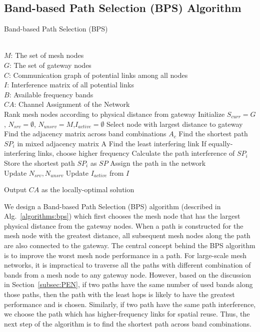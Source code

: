 \subsection{Band-based Path Selection (BPS) Algorithm}
\label{subsec:BPS}

\begin{algorithm}[t]
    \small
\caption{Band-based Path Selection (BPS)}
\label{algorithms:bps}
\begin{algorithmic}[1]
\REQUIRE  ~~\\
	$M$: The set of mesh nodes\\
	$G$: The set of gateway nodes\\
	$C$: Communication graph of potential links among all nodes\\
	$I$: Interference matrix of all potential links \\
	$B$: Available frequency bands
\ENSURE ~~\\    
$CA$: Channel Assignment of the Network\\
\STATE Rank mesh nodes according to physical distance from gateway
\STATE Initialize $S_{curr}=G$, $N_{srv}=\emptyset$, $N_{unsrv}=M$,$I_{active}=\emptyset$
\STATE Select node with largest distance to gateway
\STATE Find the adjacency matrix across band combinations $A_c$
\STATE Find the shortest path $SP_i$ in mixed adjacency matrix A 
\STATE Find the least interfering link
\STATE If equally-interfering links, choose higher frequency
\STATE Calculate the path interference of $SP_i$
\ENDFOR
\STATE Store the shortest path $SP_i$ as $SP$
\ENDFOR
\STATE Assign the path in the network\\
		\STATE Update $N_{srv},N_{unsrv}$
		\STATE Update $I_{active}$ from $I$
\ENDWHILE 

Output $CA$ as the locally-optimal solution\\
\end{algorithmic}
\end{algorithm}

We design a Band-based Path Selection (BPS) algorithm
(described in Alg.~\ref{algorithms:bps}) which first chooses the mesh node that has the largest
physical distance from the gateway nodes. When a path is constructed for
the mesh node with the greatest distance, all subsequent mesh nodes along
the path are also connected to the gateway. The central concept behind the
BPS algorithm is to improve the worst mesh node performance in a path.
For large-scale mesh networks, it is impractical to traverse all the paths with
different combination of bands from a mesh node to any gateway node. However,
based on the discussion in Section~\ref{subsec:PEN}, if two paths have the same
number of used bands along those paths, then the path with the least hops
is likely to have the greatest performance and is chosen.  Similarly, if
two path have the same path interference, we choose the path which has
higher-frequency links for spatial reuse. Thus, the next step of the
algorithm is to find the shortest path across band combinations.

